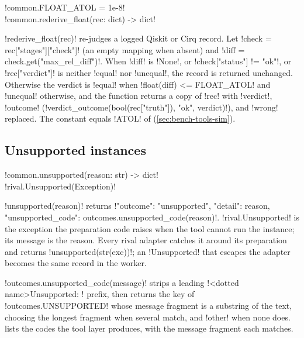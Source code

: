 \begin{signature}
\py!common.FLOAT_ATOL = 1e-8!\\
\py!common.rederive_float(rec: dict) -> dict!
\end{signature}

\py!rederive_float(rec)! re-judges a logged Qiskit or Cirq record. Let \py!check = rec["stages"]["check"]! (an empty mapping when absent) and \py!diff = check.get("max_rel_diff")!. When \py!diff! is \py!None!, or \py!check["status"] != "ok"!, or \py!rec["verdict"]! is neither \code!equal! nor \code!unequal!, the record is returned unchanged. Otherwise the verdict is \code!equal! when \py!float(diff) <= FLOAT_ATOL! and \code!unequal! otherwise, and the function returns a copy of \py!rec! with \code!verdict!, \code!outcome! (\py!verdict_outcome(bool(rec["truth"]), "ok", verdict)!), and \code!wrong! replaced. The constant equals \py!ATOL! of  (\cref{sec:bench-tools-sim}).

\subsection{Unsupported instances}\label{sec:bench-tools-unsupported}

\begin{signature}
\py!common.unsupported(reason: str) -> dict!\\
\py!rival.Unsupported(Exception)!
\end{signature}

\py!unsupported(reason)! returns \py!{"outcome": "unsupported", "detail": reason, "unsupported_code": outcomes.unsupported_code(reason)}!. \py!rival.Unsupported! is the exception the preparation code raises when the tool cannot run the instance; its message is the reason. Every rival adapter catches it around its preparation and returns \py!unsupported(str(exc))!; an \py!Unsupported! that escapes the adapter becomes the same record in the worker.

\py!outcomes.unsupported_code(message)! strips a leading \code!<dotted name>Unsupported: ! prefix, then returns the key of \py!outcomes.UNSUPPORTED! whose message fragment is a substring of the text, choosing the longest fragment when several match, and \code!other! when none does.  lists the codes the tool layer produces, with the message fragment each matches.

